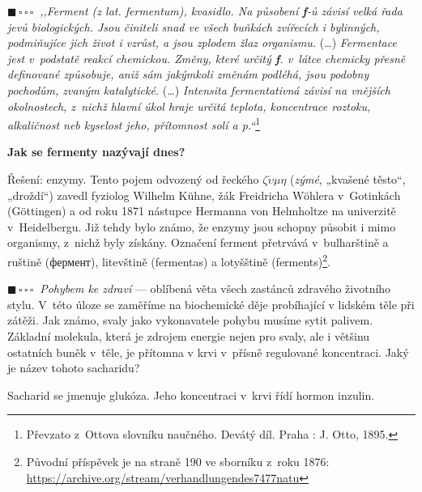 \documentclass{book}
\newcommand{\jeden}{$\blacksquare \, \square \, \square \, \square \; \; $}
\renewenvironment{quotation}{\par}{\par} %
\begin{document}
\begin{quotation}
\jeden \textit{,,Ferment (z lat. fermentum), kvasidlo. Na působení \textbf{f}-ů závisí velká
řada jevů biologických. Jsou činiteli snad ve všech buňkách zvířecích
i bylinných, podmiňujíce jich život i vzrůst, a jsou zplodem žlaz
organismu.} (\ldots) \textit{Fermentace jest v~podstatě reakcí chemickou. Změny,
které určitý \textbf{f}. v~látce chemicky přesně definované způsobuje, aniž
sám jakýmkoli změnám podléhá, jsou podobny pochodům, zvaným katalytické.}
(\ldots) \textit{Intensita fermentativná závisí na vnějších okolnostech, z~nichž
hlavní úkol hraje určitá teplota, koncentrace roztoku, alkaličnost
neb kyselost jeho, přítomnost solí a p.``}\footnote{Převzato z~Ottova slovníku naučného. Devátý díl. Praha : J. Otto,
1895.}

\textbf{Jak se fermenty nazývají dnes?}
\end{quotation} \dotfill \par 
Řešení: enzymy. Tento pojem odvozený od řeckého $\zeta\acute{\upsilon}\mu\eta$
(\textit{zýmé}, „kvašené těsto“, „droždí“) zavedl fyziolog Wilhelm Kühne, žák
Freidricha Wöhlera v~Gotinkách (Göttingen) a od roku 1871 nástupce
Hermanna von Helmholtze na univerzitě v~Heidelbergu. Již tehdy bylo
známo, že enzymy jsou schopny působit i mimo organismy, z~nichž byly
získány. Označení ferment přetrvává v~bulharštině a ruštině (фермент),
litevštině (fermentas) a lotyšštině (ferments)\footnote{Původní příspěvek je na straně 190 ve sborníku z~roku 1876: \href{https://archive.org/stream/verhandlungendes7477natu}{https://archive.org/stream/verhandlungendes7477natu}}.

\hrulefill %
\begin{quotation}
\jeden \textit{Pohybem ke zdraví} --- oblíbená věta všech zastánců zdravého životního
stylu. V~této úloze se zaměříme na biochemické děje probíhající v
lidském těle při zátěži. Jak známo, svaly jako vykonavatele pohybu
musíme sytit palivem. Základní molekula, která je zdrojem energie
nejen pro svaly, ale i většinu ostatních buněk v~těle, je přítomna
v krvi v~přísně regulované koncentraci. Jaký je název tohoto sacharidu?
\end{quotation} \dotfill \par 
Sacharid se jmenuje glukóza. Jeho koncentraci v~krvi řídí hormon inzulin.
\end{document}

